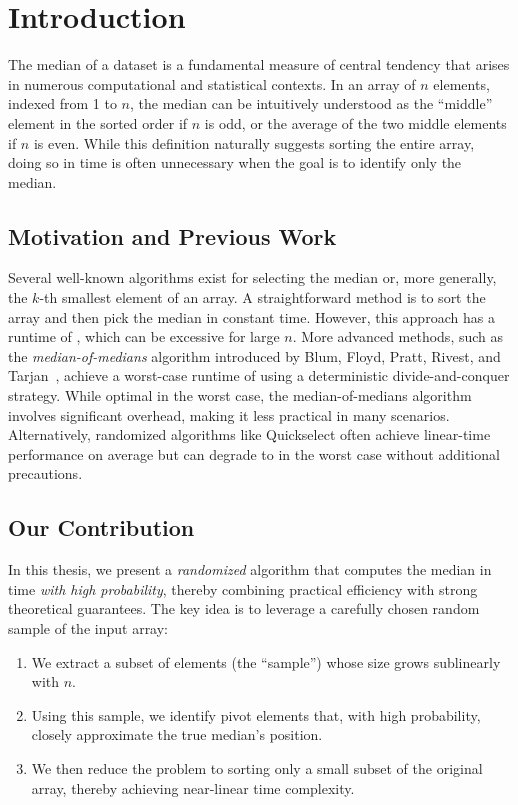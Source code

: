 
\chapter{Introduction}\label{ch:paper_introduction}

The median of a dataset is a fundamental measure of central tendency that arises in numerous computational and statistical contexts. In an array of \(n\) elements, indexed from 1 to \(n\), the median can be intuitively understood as the “middle” element in the sorted order if \(n\) is odd, or the average of the two middle elements if \(n\) is even. While this definition naturally suggests sorting the entire array, doing so in  time is often unnecessary when the goal is to identify only the median.

\section*{Motivation and Previous Work}

Several well-known algorithms exist for selecting the median or, more generally, the \(k\)-th smallest element of an array. A straightforward method is to sort the array and then pick the median in constant time. However, this approach has a runtime of , which can be excessive for large \(n\). More advanced methods, such as the \emph{median-of-medians} algorithm introduced by Blum, Floyd, Pratt, Rivest, and Tarjan~\cite{blum1973time}, achieve a worst-case runtime of  using a deterministic divide-and-conquer strategy. While optimal in the worst case, the median-of-medians algorithm involves significant overhead, making it less practical in many scenarios. Alternatively, randomized algorithms like Quickselect often achieve linear-time performance on average but can degrade to  in the worst case without additional precautions.

\section*{Our Contribution}

In this thesis, we present a \emph{randomized} algorithm that computes the median in  time \emph{with high probability}, thereby combining practical efficiency with strong theoretical guarantees. The key idea is to leverage a carefully chosen random sample of the input array:
\begin{enumerate}
    \item We extract a subset of elements (the “sample”) whose size grows sublinearly with \(n\).
    \item Using this sample, we identify pivot elements that, with high probability, closely approximate the true median's position.
    \item We then reduce the problem to sorting only a small subset of the original array, thereby achieving near-linear time complexity.
\end{enumerate}

